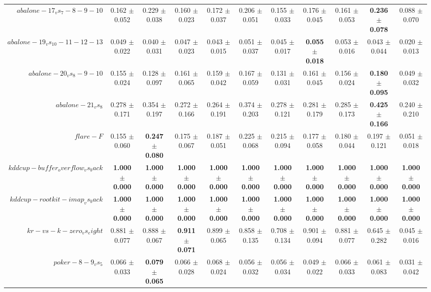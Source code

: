 \begin{table}[!ht]
{\begin{tabular}{r c c c c c c c c c c}
$abalone-17_vs_7-8-9-10$ & 0.162 $\pm$ 0.052 & 0.229 $\pm$ 0.038 & 0.160 $\pm$ 0.023 & 0.172 $\pm$ 0.037 & 0.206 $\pm$ 0.051 & 0.155 $\pm$ 0.033 & 0.176 $\pm$ 0.045 & 0.161 $\pm$ 0.053 & \textbf{0.236 $\pm$ 0.078} & 0.088 $\pm$ 0.070 \\
$abalone-19_vs_10-11-12-13$ & 0.049 $\pm$ 0.022 & 0.040 $\pm$ 0.031 & 0.047 $\pm$ 0.023 & 0.043 $\pm$ 0.015 & 0.051 $\pm$ 0.037 & 0.045 $\pm$ 0.017 & \textbf{0.055 $\pm$ 0.018} & 0.053 $\pm$ 0.016 & 0.043 $\pm$ 0.044 & 0.020 $\pm$ 0.013 \\
$abalone-20_vs_8-9-10$ & 0.155 $\pm$ 0.024 & 0.128 $\pm$ 0.097 & 0.161 $\pm$ 0.065 & 0.159 $\pm$ 0.042 & 0.167 $\pm$ 0.059 & 0.131 $\pm$ 0.031 & 0.161 $\pm$ 0.045 & 0.156 $\pm$ 0.024 & \textbf{0.180 $\pm$ 0.095} & 0.049 $\pm$ 0.032 \\
$abalone-21_vs_8$ & 0.278 $\pm$ 0.171 & 0.354 $\pm$ 0.197 & 0.272 $\pm$ 0.166 & 0.264 $\pm$ 0.191 & 0.374 $\pm$ 0.203 & 0.278 $\pm$ 0.121 & 0.281 $\pm$ 0.179 & 0.285 $\pm$ 0.173 & \textbf{0.425 $\pm$ 0.166} & 0.240 $\pm$ 0.210 \\
$flare-F$ & 0.155 $\pm$ 0.060 & \textbf{0.247 $\pm$ 0.080} & 0.175 $\pm$ 0.067 & 0.187 $\pm$ 0.051 & 0.225 $\pm$ 0.068 & 0.215 $\pm$ 0.094 & 0.177 $\pm$ 0.058 & 0.180 $\pm$ 0.044 & 0.197 $\pm$ 0.121 & 0.051 $\pm$ 0.018 \\
$kddcup-buffer_overflow_vs_back$ & \textbf{1.000 $\pm$ 0.000} & \textbf{1.000 $\pm$ 0.000} & \textbf{1.000 $\pm$ 0.000} & \textbf{1.000 $\pm$ 0.000} & \textbf{1.000 $\pm$ 0.000} & \textbf{1.000 $\pm$ 0.000} & \textbf{1.000 $\pm$ 0.000} & \textbf{1.000 $\pm$ 0.000} & \textbf{1.000 $\pm$ 0.000} & \textbf{1.000 $\pm$ 0.000} \\
$kddcup-rootkit-imap_vs_back$ & \textbf{1.000 $\pm$ 0.000} & \textbf{1.000 $\pm$ 0.000} & \textbf{1.000 $\pm$ 0.000} & \textbf{1.000 $\pm$ 0.000} & \textbf{1.000 $\pm$ 0.000} & \textbf{1.000 $\pm$ 0.000} & \textbf{1.000 $\pm$ 0.000} & \textbf{1.000 $\pm$ 0.000} & \textbf{1.000 $\pm$ 0.000} & \textbf{1.000 $\pm$ 0.000} \\
$kr-vs-k-zero_vs_eight$ & 0.881 $\pm$ 0.077 & 0.888 $\pm$ 0.067 & \textbf{0.911 $\pm$ 0.071} & 0.899 $\pm$ 0.065 & 0.858 $\pm$ 0.135 & 0.708 $\pm$ 0.134 & 0.901 $\pm$ 0.094 & 0.881 $\pm$ 0.077 & 0.645 $\pm$ 0.282 & 0.045 $\pm$ 0.016 \\
$poker-8-9_vs_5$ & 0.066 $\pm$ 0.033 & \textbf{0.079 $\pm$ 0.065} & 0.066 $\pm$ 0.028 & 0.068 $\pm$ 0.024 & 0.056 $\pm$ 0.032 & 0.056 $\pm$ 0.034 & 0.049 $\pm$ 0.022 & 0.066 $\pm$ 0.033 & 0.061 $\pm$ 0.083 & 0.031 $\pm$ 0.042 \\

\end{tabular}}
\end{table}
